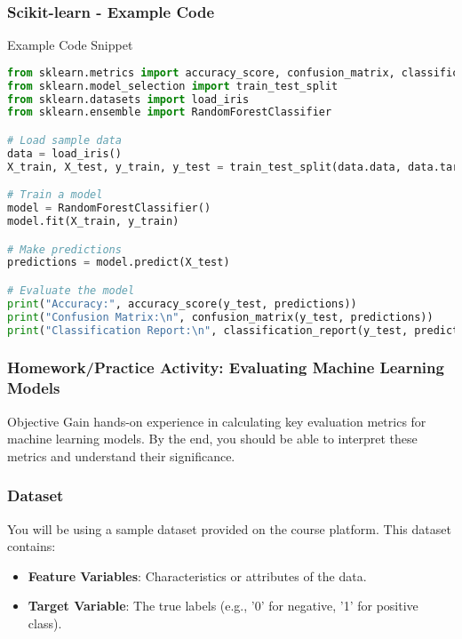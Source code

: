 \documentclass[aspectratio=169]{beamer}
\begin{document}
\begin{frame}[fragile]
    \frametitle{Scikit-learn - Example Code}
    \begin{block}{Example Code Snippet}
    \begin{lstlisting}[language=Python]
from sklearn.metrics import accuracy_score, confusion_matrix, classification_report
from sklearn.model_selection import train_test_split
from sklearn.datasets import load_iris
from sklearn.ensemble import RandomForestClassifier

# Load sample data
data = load_iris()
X_train, X_test, y_train, y_test = train_test_split(data.data, data.target, test_size=0.2)

# Train a model
model = RandomForestClassifier()
model.fit(X_train, y_train)

# Make predictions
predictions = model.predict(X_test)

# Evaluate the model
print("Accuracy:", accuracy_score(y_test, predictions))
print("Confusion Matrix:\n", confusion_matrix(y_test, predictions))
print("Classification Report:\n", classification_report(y_test, predictions))
    \end{lstlisting}
    \end{block}
\end{frame}

\begin{frame}[fragile]
    \frametitle{Homework/Practice Activity: Evaluating Machine Learning Models}
    \begin{block}{Objective}
        Gain hands-on experience in calculating key evaluation metrics for machine learning models.
        \pause
        By the end, you should be able to interpret these metrics and understand their significance.
    \end{block}
\end{frame}

\begin{frame}[fragile]
    \frametitle{Dataset}
    You will be using a sample dataset provided on the course platform. This dataset contains:
    \begin{itemize}
        \item \textbf{Feature Variables}: Characteristics or attributes of the data.
        \item \textbf{Target Variable}: The true labels (e.g., '0' for negative, '1' for positive class).
    \end{itemize}
\end{frame}
\end{document}
